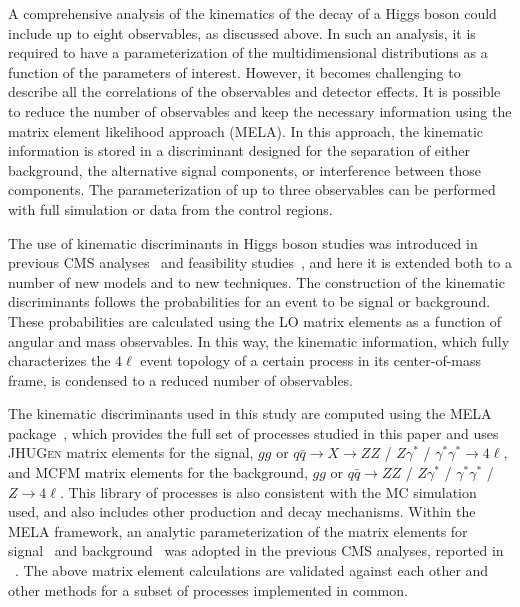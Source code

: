 A comprehensive analysis of the kinematics of the decay of a Higgs boson could include up to eight observables,
as discussed above. In such an analysis, it is required to have a parameterization of the multidimensional
distributions as a function of the parameters of interest. However, it becomes challenging to describe all
the correlations of the observables and detector effects. It is possible to reduce the number of observables
and keep the necessary information using the matrix element likelihood approach (MELA).
In this approach, the kinematic information is stored in a discriminant designed for the separation of
either background, the alternative signal components, or interference between those components.
The parameterization of up to three observables can be performed with full simulation or data from
the control regions.

The use of kinematic discriminants in Higgs boson studies was introduced in
previous CMS analyses~\cite{Chatrchyan:2012sn, Chatrchyan:2012ufa,Chatrchyan:2012jja, Chatrchyan:2013mxa,Khachatryan:2014iha}
and feasibility studies~\cite{Bolognesi:2012mm,Anderson:2013afp},
and here it is extended both to a number of new models and to new techniques.
The construction of the kinematic discriminants follows the probabilities for an event to be signal or background. These probabilities are calculated using the LO matrix elements as a function
of angular and mass observables. In this way, the kinematic information, which fully characterizes
the $4\ell$ event topology of a certain process in its center-of-mass frame, is condensed to a
reduced number of observables.

The kinematic discriminants used in this study are computed using the \textsc{MELA}
package~\cite{Chatrchyan:2012ufa,Gao:2010qx,Bolognesi:2012mm,Anderson:2013afp},
which provides the full set of processes studied in this paper and uses \textsc{JHUGen} matrix elements
for the  signal,  $gg$ or $q\bar{q}\to X\to ZZ$ / $Z\gamma^*$ / $\gamma^*\gamma^*\to4\ell$,
and \textsc{MCFM} matrix elements for the background,
$gg$ or $q\bar{q}\to ZZ$ / $Z\gamma^*$ / $\gamma^*\gamma^*$ / $Z\to 4\ell$.
This library of processes is also consistent with the MC simulation used, and also includes other production and decay mechanisms.
Within the \textsc{MELA} framework, an analytic parameterization of the matrix elements
for signal~\cite{Gao:2010qx,Bolognesi:2012mm} and background~\cite{Chen:2012jy} was adopted in the previous CMS
analyses, reported in ~\cite{Chatrchyan:2012ufa,Chatrchyan:2013lba,Chatrchyan:2012jja}.
The above matrix element calculations are validated against each other and other methods for a subset of processes implemented in common.


